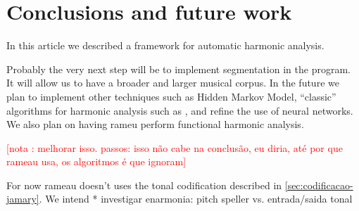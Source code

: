 \documentclass{article}
\newcounter{notacounter}
\newcommand{\nota}[1]{
  \addtocounter{notacounter}{1}
  \textcolor{red}{[nota \arabic{notacounter}: #1]}
}
\begin{document}
\section{Conclusions and future work}
\label{sec:concl-future-work}

In this article we described a framework for automatic harmonic
analysis.

Probably the very next step will be to implement segmentation in the
program. It will allow us to have a broader and larger musical corpus.
In the future we plan to implement other techniques such as Hidden
Markov Model, ``classic'' algorithms for harmonic analysis such as
\cite{Ulrich77IJ,maxwell92:expert}, and refine the use of neural
networks. We also plan on having rameu perform functional harmonic
analysis.

\nota{melhorar isso. passos: isso não cabe na conclusão, eu diria, até
por que rameau usa, os algoritmos é que ignoram}
For now rameau doesn't uses the tonal codification described
in \ref{sec:codificacao-jamary}. We intend 
* investigar enarmonia: pitch speller vs. entrada/saida tonal



\end{document}
